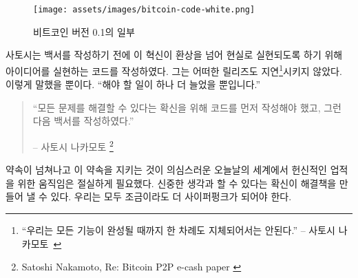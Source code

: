 \begin{figure}
	\texttt{[image: assets/images/bitcoin-code-white.png]}
	\caption{비트코인 버전 0.1의 일부}
	\label{fig:bitcoin-code-white}
\end{figure}

\begin{comment}
	To make sure that his innovation transcends fantasy and becomes reality, Satoshi
	wrote code to implement his idea before he wrote the whitepaper. He also made
	sure not to delay\footnote{\enquote{We shouldn't delay forever until every possible
			feature is done.} -- Satoshi Nakamoto~\cite{satoshi-delay}} any release forever.
	After all, \enquote{there's always going to be one more thing to do.}
\end{comment}
사토시는 백서를 작성하기 전에 이 혁신이 환상을 넘어 현실로 실현되도록 하기 위해 아이디어를 실현하는 코드를 작성하였다.
그는 어떠한 릴리즈도 지연\footnote{\enquote{우리는 모든 기능이 완성될 때까지 한 차례도 지체되어서는 안된다.} -- 사토시 나카모토~\cite{satoshi-delay}}시키지 않았다.
이렇게 말했을 뿐이다. \enquote{해야 할 일이 하나 더 늘었을 뿐입니다.}


\begin{quotation}\begin{samepage}
		\enquote{모든 문제를 해결할 수 있다는 확신을 위해 코드를 먼저 작성해야 했고, 그런 다음 백서를 작성하였다.}
		\begin{flushright} -- 사토시 나카모토 \footnote{Satoshi Nakamoto, Re: Bitcoin P2P e-cash paper \cite{satoshi-mail-code-first}}
\end{flushright}\end{samepage}\end{quotation}

\begin{comment}
	In today's world of endless promises and doubtful execution, an exercise
	in dedicated building was desperately needed. Be deliberate, convince
	yourself that you can actually solve the problems, and implement the
	solutions. We should all aim to be a bit more cypherpunk.
\end{comment}
약속이 넘쳐나고 이 약속을 지키는 것이 의심스러운 오늘날의 세계에서 
헌신적인 업적을 위한 움직임은 절실하게 필요했다.
신중한 생각과 할 수 있다는 확신이 해결책을 만들어 낼 수 있다.
우리는 모두 조금이라도 더 사이퍼펑크가 되어야 한다.

